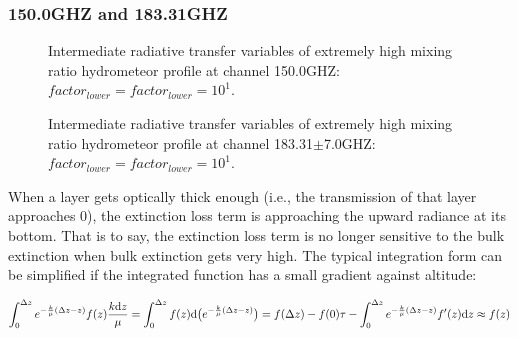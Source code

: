 \subsubsection{150.0GHZ and 183.31GHZ}

\begin{figure}[hbtp] 
\centering
{}
\caption{Intermediate radiative transfer variables of extremely high mixing ratio hydrometeor profile
at channel 150.0GHZ: $factor_{lower} = factor_{lower} = 10^{1}$.}
\label{fig:MWHSX2zi44}
\end{figure}

\begin{figure}[hbtp] 
\centering
{}
\caption{Intermediate radiative transfer variables of extremely high mixing ratio hydrometeor profile
at channel 183.31$\pm$7.0GHZ: $factor_{lower} = factor_{lower} = 10^{1}$.}
\label{fig:MWHSX3zi44}
\end{figure}

\clearpage
{} When a layer gets optically thick enough (i.e., the transmission of that layer approaches 0), the extinction loss term
is approaching the upward radiance at its bottom. That is to say, the extinction loss term is no longer sensitive to the bulk extinction when
bulk extinction gets very high.
The typical integration form can be simplified if the integrated function has a small gradient against altitude:

\begin{equation}
    \int_{0}^{\Delta z} e^{-\frac{k}{\mu}(\Delta z - z)} f(z) \frac{k\mathrm{d} z}{\mu} = 
    \int_{0}^{\Delta z} f(z) \mathrm{d} \big( e^{-\frac{k}{\mu}(\Delta z - z)} \big) =
    f(\Delta z) - f(0)\tau - \int_{0}^{\Delta z} e^{-\frac{k}{\mu}(\Delta z - z)} f'(z) \mathrm{d} z  \approx
    f(z)
\end{equation}

